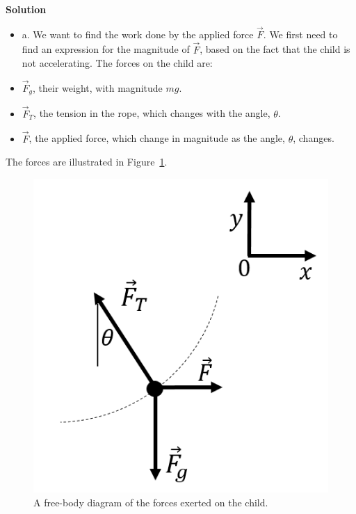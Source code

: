\begin{framed}
\textbf{Solution}\\
\begin{itemize}
\item a. We want to find the work done by the applied force $\vec F$. We first need to find an expression for the magnitude of $\vec F$, based on the fact that the child is not accelerating. The forces on the child are:
\item $\vec F_g$, their weight, with magnitude $mg$.
\item $\vec F_T$, the tension in the rope, which changes with the angle, $\theta$.
\item $\vec F$, the applied force, which change in magnitude as the angle, $\theta$, changes.
\end{itemize}

The forces are illustrated in Figure~\ref{fig:workenergy:swingprobfbd}.

\begin{figure}[!htbp]
\centering
\includegraphics[width=0.3\linewidth]{files/swingprobfbd-ba84c7450092567037aea8b370051104.png}
\caption[]{A free-body diagram of the forces exerted on the child.}
\label{fig:workenergy:swingprobfbd}
\end{figure}


\end{framed}
